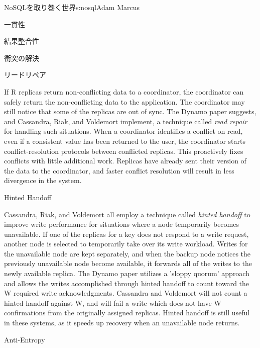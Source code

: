 \begin{aosachapter}{NoSQLを取り巻く世界}{s:nosql}{Adam Marcus}
\begin{aosasect1}{一貫性}
\begin{aosasect2}{結果整合性}
\begin{aosasect3}{衝突の解決}
\end{aosasect3}

\begin{aosasect3}{リードリペア}

If R replicas return non-conflicting data to a coordinator, the
coordinator can safely return the non-conflicting data to the
application.  The coordinator may still notice that some of the
replicas are out of sync.  The Dynamo paper suggests, and Cassandra,
Riak, and Voldemort implement, a technique called \emph{read repair}
for handling such situations.  When a coordinator identifies a
conflict on read, even if a consistent value has been returned to the
user, the coordinator starts conflict-resolution protocols between
conflicted replicas.  This proactively fixes conflicts with little
additional work.  Replicas have already sent their version of the data to
the coordinator, and faster conflict resolution will result in less
divergence in the system.

\end{aosasect3}

\begin{aosasect3}{Hinted Handoff}

Cassandra, Riak, and Voldemort all employ a technique called
\emph{hinted handoff} to improve write performance for situations
where a node temporarily becomes unavailable. If one of the replicas
for a key does not respond to a write request, another node is
selected to temporarily take over its write workload.  Writes for the
unavailable node are kept separately, and when the backup node notices
the previously unavailable node become available, it forwards all of
the writes to the newly available replica.  The Dynamo paper utilizes
a 'sloppy quorum' approach and allows the writes accomplished through
hinted handoff to count toward the W required write acknowledgments.
Cassandra and Voldemort will not count a hinted handoff against W, and
will fail a write which does not have W confirmations from the
originally assigned replicas.  Hinted handoff is still useful in these
systems, as it speeds up recovery when an unavailable node returns.

\end{aosasect3}

\begin{aosasect3}{Anti-Entropy}


\end{aosasect3}
\end{aosasect2}
\end{aosasect1}
\end{aosachapter}
